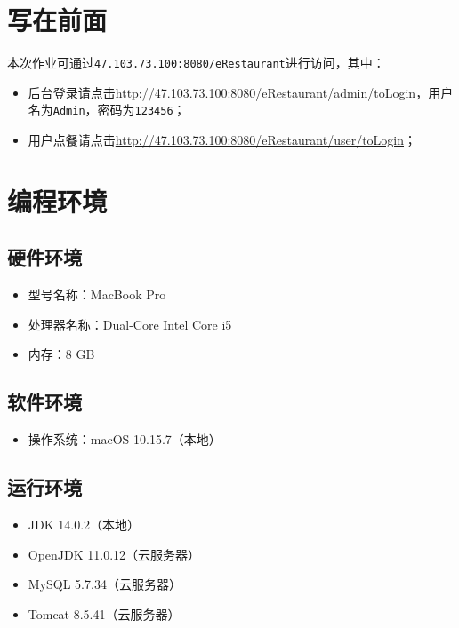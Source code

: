 \documentclass[11pt]{homework}
\begin{document}
\maketitle

\section*{写在前面}

本次作业可通过\verb|47.103.73.100:8080/eRestaurant|进行访问，其中：
\begin{itemize}
  \item 后台登录请点击\url{http://47.103.73.100:8080/eRestaurant/admin/toLogin}，用户名为\verb|Admin|，密码为\verb|123456|；
  \item 用户点餐请点击\url{http://47.103.73.100:8080/eRestaurant/user/toLogin}；
\end{itemize}

\section*{编程环境}

  \subsection*{硬件环境}
  \begin{itemize}
    \item 型号名称：MacBook Pro
    \item 处理器名称：Dual-Core Intel Core i5
    \item 内存：8 GB
  \end{itemize}

  \subsection*{软件环境}
  \begin{itemize}
    \item 操作系统：macOS 10.15.7（本地）
  \end{itemize}

  \subsection*{运行环境}
  \begin{itemize}
    \item JDK 14.0.2（本地）
    \item OpenJDK 11.0.12（云服务器）
    \item MySQL 5.7.34（云服务器）
    \item Tomcat 8.5.41（云服务器）
  \end{itemize}
\end{document}
